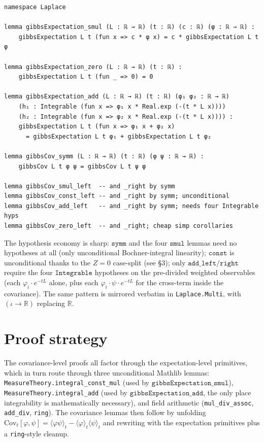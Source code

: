 \documentclass[11pt]{article}
\begin{document}
\begin{verbatim}
namespace Laplace

lemma gibbsExpectation_smul (L : ℝ → ℝ) (t : ℝ) (c : ℝ) (φ : ℝ → ℝ) :
    gibbsExpectation L t (fun x => c * φ x) = c * gibbsExpectation L t φ

lemma gibbsExpectation_zero (L : ℝ → ℝ) (t : ℝ) :
    gibbsExpectation L t (fun _ => 0) = 0

lemma gibbsExpectation_add (L : ℝ → ℝ) (t : ℝ) (φ₁ φ₂ : ℝ → ℝ)
    (h₁ : Integrable (fun x => φ₁ x * Real.exp (-(t * L x))))
    (h₂ : Integrable (fun x => φ₂ x * Real.exp (-(t * L x)))) :
    gibbsExpectation L t (fun x => φ₁ x + φ₂ x)
      = gibbsExpectation L t φ₁ + gibbsExpectation L t φ₂

lemma gibbsCov_symm (L : ℝ → ℝ) (t : ℝ) (φ ψ : ℝ → ℝ) :
    gibbsCov L t φ ψ = gibbsCov L t ψ φ

lemma gibbsCov_smul_left  -- and _right by symm
lemma gibbsCov_const_left -- and _right by symm; unconditional
lemma gibbsCov_add_left   -- and _right by symm; needs four Integrable hyps
lemma gibbsCov_zero_left  -- and _right; cheap simp corollaries
\end{verbatim}

\noindent The hypothesis economy is sharp:
$\texttt{symm}$ and the four $\texttt{smul}$ lemmas need no hypotheses
at all (only unconditional Bochner-integral linearity);
$\texttt{const}$ is unconditional thanks to the $Z=0$ case-split (see
\S3); only $\texttt{add\_left/right}$ require the four
$\texttt{Integrable}$ hypotheses on the pre-divided weighted
observables (each $\varphi_i \cdot e^{-tL}$ alone, plus each
$\varphi_i \cdot \psi \cdot e^{-tL}$ for the cross-term inside the
covariance). The same pattern is mirrored verbatim in
\texttt{Laplace.Multi}, with $(\iota \to \mathbb{R})$ replacing
$\mathbb{R}$.

\section{Proof strategy}

The covariance-level proofs all factor through the
expectation-level primitives, which in turn route through three
unconditional Mathlib lemmas:
\texttt{MeasureTheory.integral\_const\_mul} (used by
$\texttt{gibbsExpectation\_smul}$),
\texttt{MeasureTheory.integral\_add} (used by
$\texttt{gibbsExpectation\_add}$, the only place integrability
is mathematically necessary), and field arithmetic
(\texttt{mul\_div\_assoc}, \texttt{add\_div}, \texttt{ring}).
The covariance lemmas then follow by unfolding
$\mathrm{Cov}_t[\varphi, \psi] = \langle \varphi\psi\rangle_t - \langle\varphi\rangle_t \langle\psi\rangle_t$
and rewriting with the expectation primitives plus a
\texttt{ring}-style cleanup.
\end{document}
